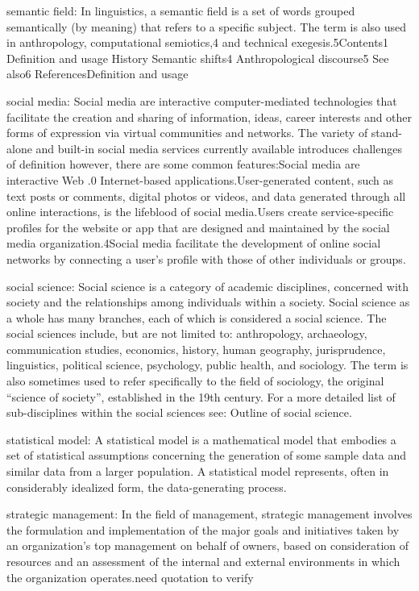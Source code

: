 \documentclass[]{book}
\begin{document}
semantic field: In linguistics, a semantic field is a set of words
grouped semantically (by meaning) that refers to a specific subject. The
term is also used in anthropology, computational semiotics,4 and
technical exegesis.5Contents1 Definition and usage History Semantic
shifts4 Anthropological discourse5 See also6 ReferencesDefinition and
usage

social media: Social media are interactive computer-mediated
technologies that facilitate the creation and sharing of information,
ideas, career interests and other forms of expression via virtual
communities and networks. The variety of stand-alone and built-in social
media services currently available introduces challenges of definition
however, there are some common features:Social media are interactive Web
.0 Internet-based applications.User-generated content, such as text
posts or comments, digital photos or videos, and data generated through
all online interactions, is the lifeblood of social media.Users create
service-specific profiles for the website or app that are designed and
maintained by the social media organization.4Social media facilitate the
development of online social networks by connecting a user's profile
with those of other individuals or groups.

social science: Social science is a category of academic disciplines,
concerned with society and the relationships among individuals within a
society. Social science as a whole has many branches, each of which is
considered a social science. The social sciences include, but are not
limited to: anthropology, archaeology, communication studies, economics,
history, human geography, jurisprudence, linguistics, political science,
psychology, public health, and sociology. The term is also sometimes
used to refer specifically to the field of sociology, the original
``science of society'', established in the 19th century. For a more
detailed list of sub-disciplines within the social sciences see: Outline
of social science.

statistical model: A statistical model is a mathematical model that
embodies a set of statistical assumptions concerning the generation of
some sample data and similar data from a larger population. A
statistical model represents, often in considerably idealized form, the
data-generating process.

strategic management: In the field of management, strategic management
involves the formulation and implementation of the major goals and
initiatives taken by an organization's top management on behalf of
owners, based on consideration of resources and an assessment of the
internal and external environments in which the organization
operates.need quotation to verify
\end{document}
